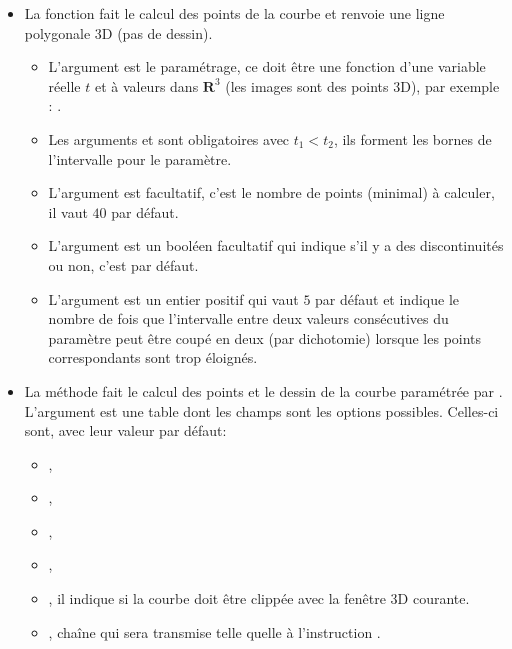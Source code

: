 \begin{itemize}
\item La fonction  fait le calcul des points de la courbe et renvoie une ligne polygonale 3D (pas de dessin).
  \begin{itemize}
    \item L'argument  est le paramétrage, ce doit être une fonction d'une variable réelle $t$ et à valeurs dans $\mathbf R^3$ (les images sont des points 3D), par exemple :
    .
    
    \item  Les arguments  et  sont obligatoires avec \(t_1 < t_2\), ils forment les bornes de l'intervalle pour le paramètre.
    
    \item L'argument  est facultatif, c'est le nombre de points (minimal) à calculer, il vaut $40$ par défaut.
    
    \item L'argument  est un booléen facultatif qui indique s'il y a des discontinuités ou non, c'est \false par défaut.
    
    \item L'argument  est un entier positif qui vaut $5$ par défaut et indique le nombre de fois que l'intervalle entre deux valeurs consécutives du paramètre peut être coupé en deux (par dichotomie) lorsque les points correspondants sont trop éloignés.
  \end{itemize}
  
\item La méthode  fait le calcul des points et le dessin de la courbe paramétrée par . L'argument  est une table dont les champs sont les options possibles. Celles-ci sont, avec leur valeur par défaut:

  \begin{itemize}
      \item {},
      \item {}, 
      \item {},
      \item {},
      \item {}, il indique si la courbe doit être clippée avec la fenêtre 3D courante.
      \item {}, chaîne qui sera transmise telle quelle à l'instruction \drawcmd .
  \end{itemize}
\end{itemize} 

